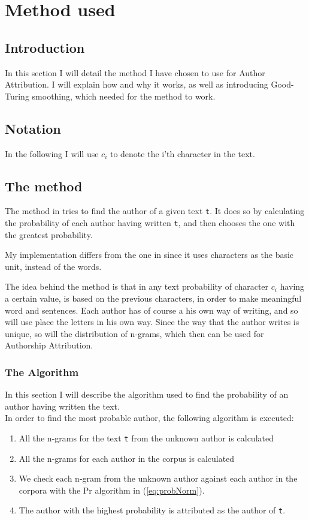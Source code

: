 \section{Method used}
\label{method}

\subsection{Introduction}
In this section I will detail the method I have chosen to use for Author Attribution. I will explain how and why it works, as well as introducing Good-Turing smoothing, which needed for the method to work.

\subsection*{Notation}
In the following I will use $c_i$ to denote the i'th character in the text.

\subsection{The method}
The method in \cite{nr4} tries to find the author of a given text \texttt{t}. It does so by calculating the probability of each author having written \texttt{t}, and then chooses the one with the greatest probability.

My implementation differs from the one in \cite{nr4} since it uses characters as the basic unit, instead of the words. 

The idea behind the method is that in any text probability of character $c_i$ having a certain value, is based on the previous characters, in order to make meaningful word and sentences. Each author has of course a his own way of writing, and so will use place the letters in his own way. Since the way that the author writes is unique, so will the distribution of n-grams, which then can be used for Authorship Attribution.

\subsubsection*{The Algorithm}
In this section I will describe the algorithm used to find the probability of an author having written the text.\\

In order to find the most probable author, the following algorithm is executed:

\begin{enumerate}
\item All the n-grams for the text \texttt{t} from the unknown author is calculated
\item All the n-grams for each author in the corpus is calculated
\item We check each n-gram from the unknown author against each author in the corpora with the Pr algorithm in (\ref{eq:probNorm}).  
\item The author with the highest probability is attributed as the author of \texttt{t}.
\end{enumerate}

